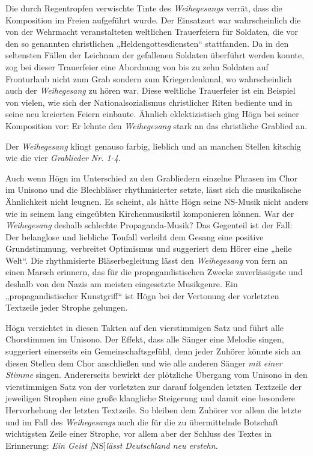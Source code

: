 \documentclass{book}
\newcommand{\zitat}[1]{\textit{#1}}
\begin{document}
Die durch Regentropfen verwischte Tinte des \textit{Weihegesangs}
verrät, dass die Komposition im Freien aufgeführt wurde. Der Einsatzort
war wahrscheinlich die von der Wehrmacht veranstalteten weltlichen
Trauerfeiern für Soldaten, die vor den so genannten christlichen
„Heldengottesdiensten“ stattfanden. Da in den seltensten Fällen der
Leichnam der gefallenen Soldaten überführt werden konnte, zog bei
dieser Trauerfeier eine Abordnung von bis zu zehn Soldaten auf
Fronturlaub nicht zum Grab sondern zum Kriegerdenkmal, wo
wahr\-scheinlich auch der \textit{Weihegesang} zu hören war. Diese
weltliche Trauerfeier ist ein Beispiel von vielen, wie sich der
Nationalsozialismus christlicher Riten be\-diente und in seine neu
kreierten Feiern einbaute. Ähnlich eklektizistisch ging Högn bei seiner
Komposition vor: Er lehnte den \textit{Weihegesang} stark an das
christliche Grablied an.

Der \textit{Weihegesang} klingt genauso farbig, lieblich und an manchen
Stellen kitschig wie die vier \textit{Grablieder Nr. 1-4}.

Auch wenn Högn im Unterschied zu den Grabliedern einzelne Phrasen im
Chor im Unisono und die Blechbläser rhythmisierter setzte, lässt sich
die musikalische Ähnlichkeit nicht leugnen. Es scheint, als hätte Högn
seine NS-Musik nicht anders wie in seinem lang eingeübten
Kirchenmusikstil kompo\-nieren können. War der \textit{Weihegesang}
deshalb schlechte Propaganda-Musik? Das Gegenteil ist der Fall: Der
belanglose und liebliche Tonfall verleiht dem Gesang eine positive
Grundstimmung, verbreitet Optimismus und suggeriert dem Hörer eine
„heile Welt“. Die rhythmisierte Bläserbegleitung lässt den
\textit{Weihegesang} von fern an einen Marsch erinnern, das für die
propagandistischen Zwecke zuverlässigste und deshalb von den Nazis am
meisten eingesetzte Musikgenre. Ein „propagandistischer Kunstgriff“ ist
Högn bei der Vertonung der vorletzten Textzeile jeder Strophe gelungen.


Högn verzichtet in diesen Takten auf den vierstimmigen Satz und führt
alle Chorstimmen im Unisono. Der Effekt, dass alle Sänger eine Melodie
sin\-gen, suggeriert einerseits ein Gemeinschaftsgefühl, denn jeder
Zuhörer könnte sich an diesen Stellen dem Chor anschließen und wie alle
anderen Sänger \textit{mit einer Stimme} singen. Andererseits bewirkt
der plötzliche Übergang vom Uni\-sono in den vierstimmigen Satz von der
vorletzten zur darauf folgenden letz\-ten Textzeile der jeweiligen
Strophen eine große klangliche Steigerung und damit eine besondere
Hervorhebung der letzten Textzeile. So bleiben dem Zuhörer vor allem
die letzte und im Fall des \textit{Weihegesangs} auch die für die zu
übermittelnde Botschaft wichtigsten Zeile einer Strophe, vor allem aber
der Schluss des Textes in Erinnerung: \zitat{Ein Geist
 \textup{[}}NS]\zitat{lässt Deutschland neu erstehn.}
\end{document}
